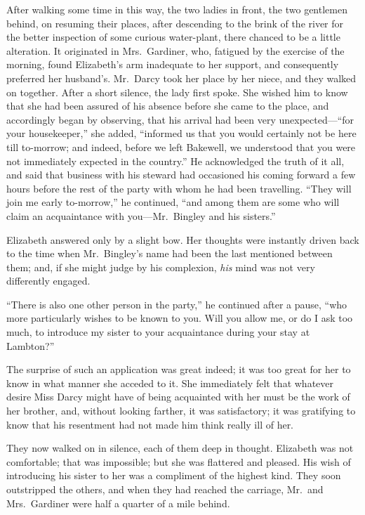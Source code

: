 \documentclass[12pt,english]{book}
\begin{document}
After walking some time in this way, the two ladies in front, the
two gentlemen behind, on resuming their places, after descending to
the brink of the river for the better inspection of some curious water-plant,
there chanced to be a little alteration. It originated in Mrs.\ Gardiner,
who, fatigued by the exercise of the morning, found Elizabeth's arm
inadequate to her support, and consequently preferred her husband's.
Mr.\ Darcy took her place by her niece, and they walked on together.
After a short silence, the lady first spoke. She wished him to know
that she had been assured of his absence before she came to the place,
and accordingly began by observing, that his arrival had been very
unexpected\mbox{---}{}``for your housekeeper,'' she added, {}``informed
us that you would certainly not be here till to-morrow; and indeed,
before we left Bakewell, we understood that you were not immediately
expected in the country.'' He acknowledged the truth of it all, and
said that business with his steward had occasioned his coming forward
a few hours before the rest of the party with whom he had been travelling.
{}``They will join me early to-morrow,'' he continued, {}``and
among them are some who will claim an acquaintance with you\mbox{---}Mr.\ Bingley
and his sisters.''

Elizabeth answered only by a slight bow. Her thoughts were instantly
driven back to the time when Mr.\ Bingley's name had been the last
mentioned between them; and, if she might judge by his complexion,
\textit{his} mind was not very differently engaged.

{}``There is also one other person in the party,'' he continued
after a pause, {}``who more particularly wishes to be known to you.
Will you allow me, or do I ask too much, to introduce my sister to
your acquaintance during your stay at Lambton?''\ 

The surprise of such an application was great indeed; it was too great
for her to know in what manner she acceded to it. She immediately
felt that whatever desire Miss Darcy might have of being acquainted
with her must be the work of her brother, and, without looking farther,
it was satisfactory; it was gratifying to know that his resentment
had not made him think really ill of her.

They now walked on in silence, each of them deep in thought. Elizabeth
was not comfortable; that was impossible; but she was flattered and
pleased. His wish of introducing his sister to her was a compliment
of the highest kind. They soon outstripped the others, and when they
had reached the carriage, Mr.\ and Mrs.\ Gardiner were half a quarter
of a mile behind.
\end{document}
